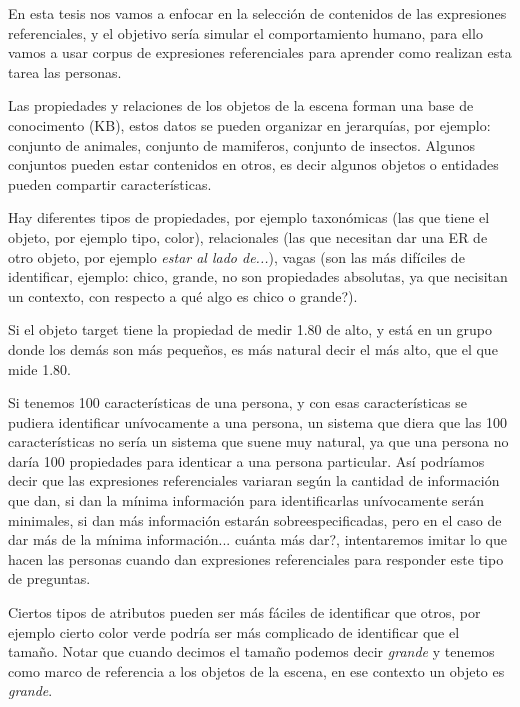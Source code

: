 En esta tesis nos vamos a enfocar en la selecci\'on de contenidos de las expresiones referenciales, y el objetivo ser\'ia simular el comportamiento humano, para ello vamos a usar corpus de expresiones referenciales para aprender como realizan esta tarea las personas.
 
Las propiedades y relaciones de los objetos de la escena forman una base de conocimento (KB), estos datos se pueden organizar en jerarqu\'ias, por ejemplo: conjunto de animales, conjunto de mamiferos, conjunto de insectos. Algunos conjuntos pueden estar contenidos en otros, es decir algunos objetos o entidades pueden compartir caracter\'isticas.

Hay diferentes tipos de propiedades, por ejemplo taxon\'omicas (las que tiene el objeto, por ejemplo tipo, color), relacionales (las que necesitan dar una ER de otro objeto, por ejemplo {\it estar al lado de...}), vagas (son las m\'as dif\'iciles de identificar, ejemplo: chico, grande, no son propiedades absolutas, ya que necisitan un contexto, con respecto a qu\'e algo es chico o grande?).

Si el objeto target tiene la propiedad de medir 1.80 de alto, y est\'a en un grupo donde los dem\'as son m\'as peque\~nos, es m\'as natural decir el m\'as alto, que el que mide 1.80.

Si tenemos 100 caracter\'isticas de una persona, y con esas caracter\'isticas se pudiera identificar un\'ivocamente a una persona, un sistema que diera que las 100 caracter\'isticas no ser\'ia un sistema que suene muy natural, ya que una persona no dar\'ia 100 propiedades para identicar a una persona particular. As\'i podr\'iamos decir que las expresiones referenciales variaran seg\'un la cantidad de informaci\'on que dan, si dan la m\'inima informaci\'on para identificarlas un\'ivocamente ser\'an minimales, si dan m\'as informaci\'on estar\'an sobreespecificadas, pero en el caso de dar m\'as de la m\'inima informaci\'on... cu\'anta m\'as dar?, intentaremos imitar lo que hacen las personas cuando dan expresiones referenciales para responder este tipo de preguntas.

Ciertos tipos de atributos pueden ser m\'as f\'aciles de identificar que otros, por ejemplo cierto color verde podr\'{i}a ser m\'as complicado de identificar que el tama\~no. Notar que cuando decimos el tama\~no podemos decir {\it grande} y tenemos como marco de referencia a los objetos de la escena, en ese contexto un objeto es {\it grande}.

